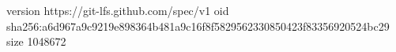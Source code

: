 version https://git-lfs.github.com/spec/v1
oid sha256:a6d967a9c9219e898364b481a9c16f8f5829562330850423f83356920524bc29
size 1048672
